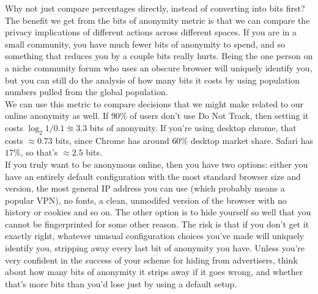 \documentclass{article}
\begin{document}
Why not just compare percentages directly, instead of converting into bits first? The benefit we get from the bits of anonymity metric is that we can compare the privacy implications of different actions across different spaces. If you are in a small community, you have much fewer bits of anonymity to spend, and so something that reduces you by a couple bits really hurts. Being the one person on a niche community forum who uses an obscure browser will uniquely identify you, but you can still do the analysis of how many bits it costs by using population numbers pulled from the global population.\\

We can use this metric to compare decisions that we might make related to our online anonymity as well. If $90\%$ of users don't use Do Not Track, then setting it costs $\log_2{1/0.1} \approxeq 3.3$ bits of anonymity. If you're using desktop chrome, that costs $\approx 0.73$ bits, since Chrome has around $60\%$ desktop market share. Safari has $17\%$, so that's $\approx 2.5$ bits.\\

If you truly want to be anonymous online, then you have two options: either you have an entirely default configuration with the most standard browser size and version, the most general IP address you can use (which probably means a popular VPN), no fonts, a clean, unmodifed version of the browser with no history or cookies and so on. The other option is to hide yourself so well that you cannot be fingerprinted for some other reason. The risk is that if you don't get it exactly right, whatever unusual configuration choices you've made will uniquely identify you, stripping away every last bit of anonymity you have. Unless you're very confident in the success of your scheme for hiding from advertisers, think about how many bits of anonymity it strips away if it goes wrong, and whether that's more bits than you'd lose just by using a default setup.\\
\end{document}
